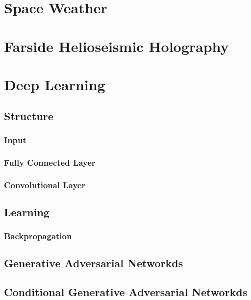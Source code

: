 \documentclass[11pt,a4paper,onecolumn]{report}
\begin{document}
%
%
\section{Space Weather}
%
%



%
%
\section{Farside Helioseismic Holography}
%
%




%
%
\section{Deep Learning}
%
%

%
\subsection{Structure}
%

\subsubsection*{Input}

\subsubsection*{Fully Connected Layer}

\subsubsection*{Convolutional Layer}



%
\subsection{Learning}
%

\subsubsection*{Backpropagation}


%
\subsection{Generative Adversarial Networkds}
%


%
\subsection{Conditional Generative Adversarial Networkds}
%
\end{document}
